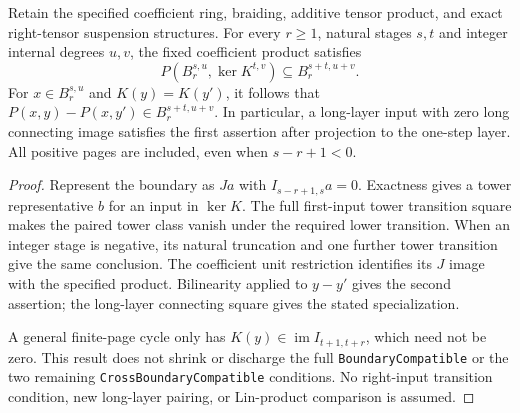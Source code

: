 \begin{proposition}
  \label{prop:h6-boundary-tower-action}
  \leanok
  Retain the specified coefficient ring, braiding, additive tensor product,
  and exact right-tensor suspension structures. For every $r\ge1$,
  natural stages $s,t$ and integer internal degrees $u,v$, the fixed
  coefficient product satisfies
  \[
    P(B_r^{s,u},\ker K^{t,v})\subseteq B_r^{s+t,u+v}.
  \]
  For $x\in B_r^{s,u}$ and $K(y)=K(y')$, it follows that
  $P(x,y)-P(x,y')\in B_r^{s+t,u+v}$.
  In particular, a long-layer input with zero long connecting image
  satisfies the first assertion after projection to the one-step layer.
  All positive pages are included, even when $s-r+1<0$.
\end{proposition}
\begin{proof}
  \leanok
  Represent the boundary as $Ja$ with $I_{s-r+1,s}a=0$.
  Exactness gives a tower representative $b$ for an input in $\ker K$.
  The full first-input tower transition square makes the paired tower
  class vanish under the required lower transition. When an integer
  stage is negative, its natural truncation and one further tower
  transition give the same conclusion. The coefficient unit restriction
  identifies its $J$ image with the specified product. Bilinearity applied
  to $y-y'$ gives the second assertion; the long-layer connecting square
  gives the stated specialization.

  A general finite-page cycle only has $K(y)\in\operatorname{im}I_{t+1,t+r}$,
  which need not be zero. This result does not shrink or discharge the
  full \texttt{BoundaryCompatible} or the two remaining
  \texttt{CrossBoundaryCompatible} conditions. No right-input transition
  condition, new long-layer pairing, or Lin-product comparison is assumed.
\end{proof}


